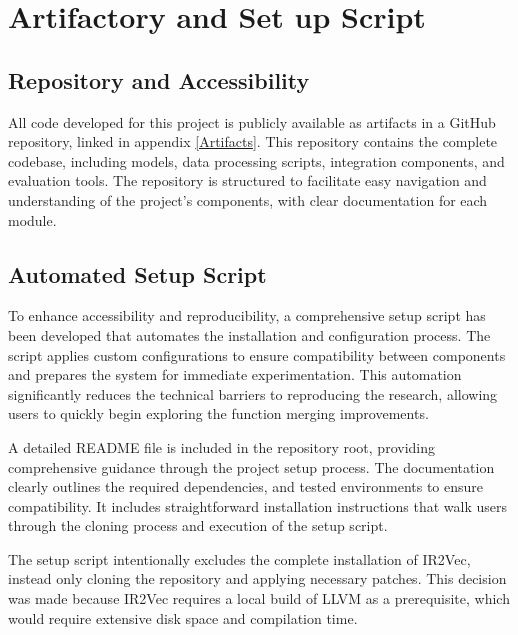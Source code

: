\section{Artifactory and Set up Script}
\subsection{Repository and Accessibility}
All code developed for this project is publicly available as artifacts in a GitHub repository, linked in appendix \ref{Artifacts}. This repository contains the complete codebase, including models, data processing scripts, integration components, and evaluation tools. The repository is structured to facilitate easy navigation and understanding of the project's components, with clear documentation for each module.

\subsection{Automated Setup Script}
To enhance accessibility and reproducibility, a comprehensive setup script has been developed that automates the installation and configuration process. The script applies custom configurations to ensure compatibility between components and prepares the system for immediate experimentation. This automation significantly reduces the technical barriers to reproducing the research, allowing users to quickly begin exploring the function merging improvements.

A detailed README file is included in the repository root, providing comprehensive guidance through the project setup process. The documentation clearly outlines the required dependencies, and tested environments to ensure compatibility. It includes straightforward installation instructions that walk users through the cloning process and execution of the setup script.

The setup script intentionally excludes the complete installation of IR2Vec, instead only cloning the repository and applying necessary patches. This decision was made because IR2Vec requires a local build of LLVM as a prerequisite, which would require extensive disk space and compilation time.













